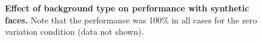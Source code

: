 \begin{figure}[ht]
{  \label{fig:bg_var4}
}

\caption[]{{\bf Effect of background type on performance with synthetic faces.} Note that the performance was 100\% in all cases for the zero variation condition (data not shown).}
\label{fig:perf_bg_variation}
\end{figure}



